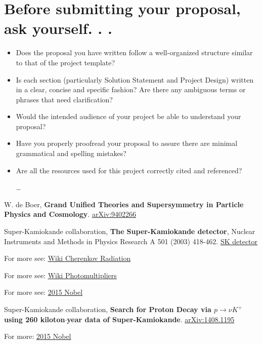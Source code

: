 \documentclass[11pt, oneside]{article}   	%
\begin{document}
\section{Before submitting your proposal, ask yourself. . .}

\begin{itemize}  
\item Does the proposal you have written follow a well-organized structure similar to that of the project template?
 
\item Is each section (particularly Solution Statement and Project Design) written in a clear, concise and specific fashion? Are there any ambiguous terms or phrases that need clarification?
 
\item Would the intended audience of your project be able to understand your proposal?

\item Have you properly proofread your proposal to assure there are minimal grammatical and spelling mistakes?

\item Are all the resources used for this project correctly cited and referenced?

\ldots 
\end{itemize}

\begin{thebibliography}{9}

  W. de Boer,
  \textbf{Grand Unified Theories
	and Supersymmetry in
	Particle Physics and Cosmology}.
  \href{https://arxiv.org/pdf/hep-ph/9402266.pdf}{arXiv:9402266}

  Super-Kamiokande collaboration,
  \textbf{The Super-Kamiokande detector},
  Nuclear Instruments and Methods in Physics Research A 501 (2003) 418-462. 
  \href{http://www-sk.icrr.u-tokyo.ac.jp/~masato_s/class/sk-detector.pdf}{SK detector}
  
  For more see: 
  \href{https://en.wikipedia.org/wiki/Cherenkov_radiation}{Wiki Cherenkov Radiation}

  For more see: 
  \href{https://en.wikipedia.org/wiki/Photomultiplier}{Wiki Photomultipliers}
  
  For more see: 
  \href{http://www.nobelprize.org/nobel_prizes/physics/laureates/2015/}{2015 Nobel}
  
  Super-Kamiokande collaboration,
  \textbf{Search for Proton Decay via $p\rightarrow \nu K^{+}$ using 260 kiloton$\cdot$year data of Super-Kamiokande}.
  \href{https://arxiv.org/pdf/1408.1195v1.pdf}{arXiv:1408.1195}
  
  For more:
  \href{http://www.nobelprize.org/nobel_prizes/physics/laureates/2015/}{2015 Nobel}


\end{thebibliography}
\end{document}
